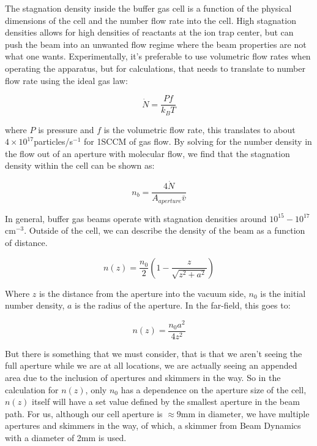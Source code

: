 The stagnation density inside the buffer gas cell is a function of the physical dimensions of the cell and the number flow rate into the cell. High stagnation densities allows for high densities of reactants at the ion trap center, but can push the beam into an unwanted flow regime where the beam properties are not what one wants. Experimentally, it's preferable to use volumetric flow rates when operating the apparatus, but for calculations, that needs to translate to number flow rate using the ideal gas law:

\begin{equation*}
	\dot{N} = \frac{P f}{k_B T}
\end{equation*}

where $P$ is pressure and $f$ is the volumetric flow rate, this translates to about $4\times10^{17}$particles/s$^{-1}$ for 1SCCM of gas flow. By solving for the number density in the flow out of an aperture with molecular flow, we find that the stagnation density within the cell can be shown as:

\begin{equation}
	n_{b}=\frac{4 \dot{N}}{A_{aperture} \bar{v}} \label{eq: n_b}
\end{equation}

In general, buffer gas beams operate with stagnation densities around $10^{15}-10^{17}$cm$^{-3}$. Outside of the cell, we can describe the density of the beam as a function of distance. \cite{Pauly}

\begin{equation}
	n(z)=\frac{n_0}{2}\left(1-\frac{z}{\sqrt{z^2+a^2}}\right) \label{eq: n(z)}
\end{equation}

Where $z$ is the distance from the aperture into the vacuum side, $n_0$ is the initial number density, $a$ is the radius of the aperture. In the far-field, this goes to:

\begin{equation*}
	n(z)=\frac{n_0 a^2}{4 z^2}
\end{equation*}

But there is something that we must consider, that is that we aren't seeing the full aperture while we are at all locations, we are actually seeing an appended area due to the inclusion of apertures and skimmers in the way. So in the calculation for $n(z)$, only $n_0$ has a dependence on the aperture size of the cell, $n(z)$ itself will have a set value defined by the smallest aperture in the beam path. For us, although our cell aperture is $\approx 9$mm in diameter, we have multiple apertures and skimmers in the way, of which, a skimmer from Beam Dynamics with a diameter of 2mm is used.

